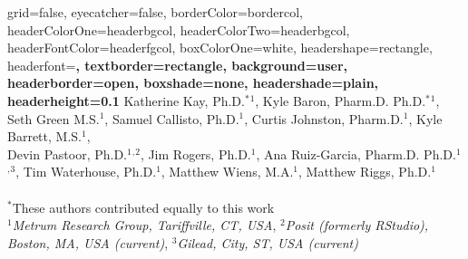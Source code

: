 \documentclass[portrait,fontscale=0.46,paperwidth=36in,paperheight=48in]{baposter}
\begin{document}

\background{
}

\begin{poster}{
	grid=false,
	eyecatcher=false, 
	borderColor=bordercol,
	headerColorOne=headerbgcol,
	headerColorTwo=headerbgcol,
	headerFontColor=headerfgcol,
	boxColorOne=white,
	headershape=rectangle,
	headerfont=\Large\bf\textsf,
	textborder=rectangle,
	background=user,
	headerborder=open,
  boxshade=none, 
  headershade=plain,
  headerheight=0.1\textheight %
}
{
}
{
	\textbf{\textsf{\color{titlefgcol}{
	A Suite of Open-Source Tools to Guide Efficient Pharmacometric Analyses
	 }}}\vspace{.5em}
}
{
	Katherine Kay, Ph.D.$^\ast$$^1$, Kyle Baron, Pharm.D. Ph.D.$^\ast$$^1$, Seth Green M.S.$^1$, 
	Samuel Callisto, Ph.D.$^1$, Curtis Johnston, Pharm.D.$^1$, Kyle Barrett, M.S.$^1$, \\
	Devin Pastoor, Ph.D.$^1$$^,$$^2$, Jim Rogers, Ph.D.$^1$, Ana Ruiz-Garcia, Pharm.D. Ph.D.$^1$$^,$$^3$, 
	Tim Waterhouse, Ph.D.$^1$, Matthew Wiens, M.A.$^1$, Matthew Riggs, Ph.D.$^1$ \\ \\
	{\smaller$^\ast$These authors contributed equally to this work \\
	  $^1$\textit{Metrum Research Group, Tariffville, CT, USA}, $^2$\textit{Posit (formerly RStudio), Boston, MA, USA (current)}, $^3$\textit{Gilead, City, ST, USA (current)}
	}
}

\end{poster}
\end{document}
